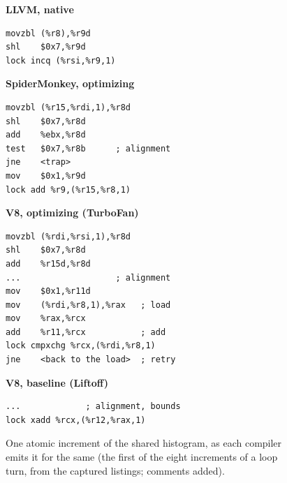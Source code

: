 \begin{figure}[tbp]
\footnotesize
\begin{minipage}[t]{0.47\linewidth}
\textbf{LLVM, native}
\begin{verbatim}
movzbl (%r8),%r9d
shl    $0x7,%r9d
lock incq (%rsi,%r9,1)
\end{verbatim}
\textbf{SpiderMonkey, optimizing}
\begin{verbatim}
movzbl (%r15,%rdi,1),%r8d
shl    $0x7,%r8d
add    %ebx,%r8d
test   $0x7,%r8b      ; alignment
jne    <trap>
mov    $0x1,%r9d
lock add %r9,(%r15,%r8,1)
\end{verbatim}
\end{minipage}\hfill
\begin{minipage}[t]{0.47\linewidth}
\textbf{V8, optimizing (TurboFan)}
\begin{verbatim}
movzbl (%rdi,%rsi,1),%r8d
shl    $0x7,%r8d
add    %r15d,%r8d
...                   ; alignment
mov    $0x1,%r11d
mov    (%rdi,%r8,1),%rax   ; load
mov    %rax,%rcx
add    %r11,%rcx           ; add
lock cmpxchg %rcx,(%rdi,%r8,1)
jne    <back to the load>  ; retry
\end{verbatim}
\textbf{V8, baseline (Liftoff)}
\begin{verbatim}
...             ; alignment, bounds
lock xadd %rcx,(%r12,%rax,1)
\end{verbatim}
\end{minipage}
\caption{One atomic increment of the shared histogram, as each compiler
emits it for the same  (the first of the eight
increments of a loop turn, from the captured listings; comments added).}
\label{fig:listings}
\end{figure}

